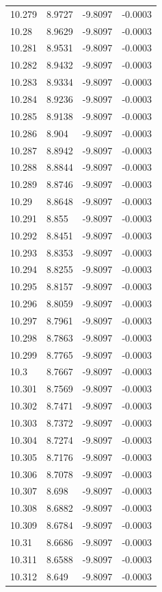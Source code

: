 \begin{tabular}{llll}
10.279 & 8.9727 & -9.8097 & -0.0003 \\
10.28 & 8.9629 & -9.8097 & -0.0003 \\
10.281 & 8.9531 & -9.8097 & -0.0003 \\
10.282 & 8.9432 & -9.8097 & -0.0003 \\
10.283 & 8.9334 & -9.8097 & -0.0003 \\
10.284 & 8.9236 & -9.8097 & -0.0003 \\
10.285 & 8.9138 & -9.8097 & -0.0003 \\
10.286 & 8.904 & -9.8097 & -0.0003 \\
10.287 & 8.8942 & -9.8097 & -0.0003 \\
10.288 & 8.8844 & -9.8097 & -0.0003 \\
10.289 & 8.8746 & -9.8097 & -0.0003 \\
10.29 & 8.8648 & -9.8097 & -0.0003 \\
10.291 & 8.855 & -9.8097 & -0.0003 \\
10.292 & 8.8451 & -9.8097 & -0.0003 \\
10.293 & 8.8353 & -9.8097 & -0.0003 \\
10.294 & 8.8255 & -9.8097 & -0.0003 \\
10.295 & 8.8157 & -9.8097 & -0.0003 \\
10.296 & 8.8059 & -9.8097 & -0.0003 \\
10.297 & 8.7961 & -9.8097 & -0.0003 \\
10.298 & 8.7863 & -9.8097 & -0.0003 \\
10.299 & 8.7765 & -9.8097 & -0.0003 \\
10.3 & 8.7667 & -9.8097 & -0.0003 \\
10.301 & 8.7569 & -9.8097 & -0.0003 \\
10.302 & 8.7471 & -9.8097 & -0.0003 \\
10.303 & 8.7372 & -9.8097 & -0.0003 \\
10.304 & 8.7274 & -9.8097 & -0.0003 \\
10.305 & 8.7176 & -9.8097 & -0.0003 \\
10.306 & 8.7078 & -9.8097 & -0.0003 \\
10.307 & 8.698 & -9.8097 & -0.0003 \\
10.308 & 8.6882 & -9.8097 & -0.0003 \\
10.309 & 8.6784 & -9.8097 & -0.0003 \\
10.31 & 8.6686 & -9.8097 & -0.0003 \\
10.311 & 8.6588 & -9.8097 & -0.0003 \\
10.312 & 8.649 & -9.8097 & -0.0003 \\

\end{tabular}
